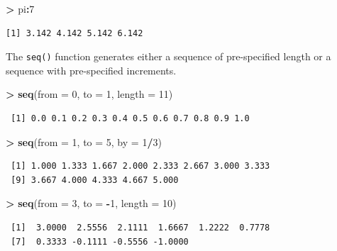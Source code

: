 \documentclass[]{krantz}
\makeatletter
\newenvironment{Shaded}{\begin{snugshade}}{\end{snugshade}}
\newcommand{\KeywordTok}[1]{\textcolor[rgb]{0.27,0.27,0.27}{\textbf{#1}}}
\newcommand{\DataTypeTok}[1]{\textcolor[rgb]{0.27,0.27,0.27}{#1}}
\newcommand{\DecValTok}[1]{\textcolor[rgb]{0.06,0.06,0.06}{#1}}
\newcommand{\StringTok}[1]{\textcolor[rgb]{0.5,0.5,0.5}{#1}}
\newcommand{\OperatorTok}[1]{\textcolor[rgb]{0.43,0.43,0.43}{\textbf{#1}}}
\newcommand{\NormalTok}[1]{#1}
\newenvironment{kframe}{%
\medskip{}
\setlength{\fboxsep}{.8em}
 \def\at@end@of@kframe{}%
 \ifinner\ifhmode%
  \def\at@end@of@kframe{\end{minipage}}%
  \begin{minipage}{\columnwidth}%
 \fi\fi%
 \def\FrameCommand##1{\hskip\@totalleftmargin \hskip-\fboxsep
 \colorbox{shadecolor}{##1}\hskip-\fboxsep
     \hskip-\linewidth \hskip-\@totalleftmargin \hskip\columnwidth}%
 \MakeFramed {\advance\hsize-\width
   \@totalleftmargin\z@ \linewidth\hsize
   \@setminipage}}%
 {\par\unskip\endMakeFramed%
 \at@end@of@kframe}
\renewenvironment{Shaded}{\begin{kframe}}{\end{kframe}}
\makeatother
\begin{document}
\begin{Shaded}
\begin{Highlighting}[]
\OperatorTok{>}\StringTok{ }\NormalTok{pi}\OperatorTok{:}\DecValTok{7}
\end{Highlighting}
\end{Shaded}

\begin{verbatim}
[1] 3.142 4.142 5.142 6.142
\end{verbatim}

The \texttt{seq()} function generates either a sequence of pre-specified
length or a sequence with pre-specified increments.

\begin{Shaded}
\begin{Highlighting}[]
\OperatorTok{>}\StringTok{ }\KeywordTok{seq}\NormalTok{(}\DataTypeTok{from =} \DecValTok{0}\NormalTok{, }\DataTypeTok{to =} \DecValTok{1}\NormalTok{, }\DataTypeTok{length =} \DecValTok{11}\NormalTok{)}
\end{Highlighting}
\end{Shaded}

\begin{verbatim}
 [1] 0.0 0.1 0.2 0.3 0.4 0.5 0.6 0.7 0.8 0.9 1.0
\end{verbatim}

\begin{Shaded}
\begin{Highlighting}[]
\OperatorTok{>}\StringTok{ }\KeywordTok{seq}\NormalTok{(}\DataTypeTok{from =} \DecValTok{1}\NormalTok{, }\DataTypeTok{to =} \DecValTok{5}\NormalTok{, }\DataTypeTok{by =} \DecValTok{1}\OperatorTok{/}\DecValTok{3}\NormalTok{)}
\end{Highlighting}
\end{Shaded}

\begin{verbatim}
 [1] 1.000 1.333 1.667 2.000 2.333 2.667 3.000 3.333
 [9] 3.667 4.000 4.333 4.667 5.000
\end{verbatim}

\begin{Shaded}
\begin{Highlighting}[]
\OperatorTok{>}\StringTok{ }\KeywordTok{seq}\NormalTok{(}\DataTypeTok{from =} \DecValTok{3}\NormalTok{, }\DataTypeTok{to =} \OperatorTok{-}\DecValTok{1}\NormalTok{, }\DataTypeTok{length =} \DecValTok{10}\NormalTok{)}
\end{Highlighting}
\end{Shaded}

\begin{verbatim}
 [1]  3.0000  2.5556  2.1111  1.6667  1.2222  0.7778
 [7]  0.3333 -0.1111 -0.5556 -1.0000
\end{verbatim}
\end{document}
